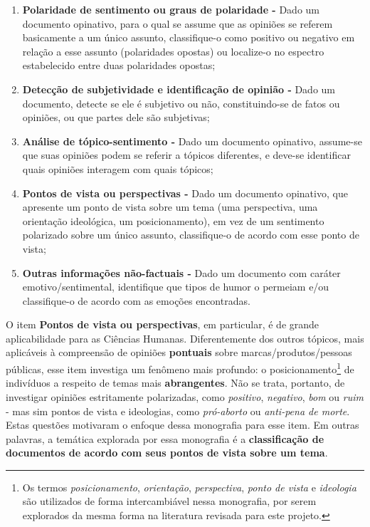 \begin{enumerate}
    \item \textbf{Polaridade de sentimento ou graus de polaridade -} Dado um documento opinativo, para o qual se assume que as opiniões se referem basicamente a um único assunto, classifique-o como positivo ou negativo em relação a esse assunto (polaridades opostas) ou localize-o no espectro estabelecido entre duas polaridades opostas;
    \item \textbf{Detecção de subjetividade e identificação de opinião -} Dado um documento, detecte se ele é subjetivo ou não, constituindo-se de fatos ou opiniões, ou que partes dele são subjetivas;
    \item \textbf{Análise de tópico-sentimento -} Dado um documento opinativo, assume-se que suas opiniões podem se referir a tópicos diferentes, e deve-se identificar quais opiniões interagem com quais tópicos;
   \item \textbf{Pontos de vista ou perspectivas -} Dado um documento opinativo, que apresente um ponto de vista sobre um tema (uma perspectiva, uma orientação ideológica, um posicionamento), em vez de um sentimento polarizado sobre um único assunto, classifique-o de acordo com esse ponto de vista;
   \item \textbf{Outras informações não-factuais -} Dado um documento com caráter emotivo/sentimental, identifique que tipos de humor o permeiam e/ou classifique-o de acordo com as emoções encontradas.

\end{enumerate}

O item \textbf{Pontos de vista ou perspectivas}, em particular, é de grande aplicabilidade para as Ciências Humanas. Diferentemente dos outros tópicos, mais aplicáveis à compreensão de opiniões \textbf{pontuais} sobre marcas/produtos/pessoas públicas, esse item investiga um fenômeno mais profundo: o posicionamento\footnote{Os termos \emph{posicionamento}, \emph{orientação}, \emph{perspectiva}, \emph{ponto de vista} e \emph{ideologia} são utilizados de forma intercambiável nessa monografia, por serem explorados da mesma forma na literatura revisada para este projeto.} de indivíduos a respeito de temas mais \textbf{abrangentes}. Não se trata, portanto, de investigar opiniões estritamente polarizadas, como \emph{positivo}, \emph{negativo}, \emph{bom} ou \emph{ruim} - mas sim pontos de vista e ideologias, como \emph{pró-aborto} ou \emph{anti-pena de morte}. Estas questões motivaram o enfoque dessa monografia para esse item. Em outras palavras, a temática explorada por essa monografia é a \textbf{classificação de documentos de acordo com seus pontos de vista sobre um tema}.

